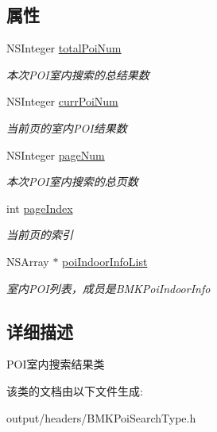 \subsection*{属性}
\begin{DoxyCompactItemize}
\item 
\hypertarget{interface_b_m_k_poi_indoor_result_a4950238a0b927b35c98a33145a5187fd}{}N\+S\+Integer \hyperlink{interface_b_m_k_poi_indoor_result_a4950238a0b927b35c98a33145a5187fd}{total\+Poi\+Num}\label{interface_b_m_k_poi_indoor_result_a4950238a0b927b35c98a33145a5187fd}

\begin{DoxyCompactList}\small\item\em 本次\+P\+O\+I室内搜索的总结果数 \end{DoxyCompactList}\item 
\hypertarget{interface_b_m_k_poi_indoor_result_a4f13b95dc645f49d1593b155518afb13}{}N\+S\+Integer \hyperlink{interface_b_m_k_poi_indoor_result_a4f13b95dc645f49d1593b155518afb13}{curr\+Poi\+Num}\label{interface_b_m_k_poi_indoor_result_a4f13b95dc645f49d1593b155518afb13}

\begin{DoxyCompactList}\small\item\em 当前页的室内\+P\+O\+I结果数 \end{DoxyCompactList}\item 
\hypertarget{interface_b_m_k_poi_indoor_result_a505ca9b103c88a5a8c74d096497ffb78}{}N\+S\+Integer \hyperlink{interface_b_m_k_poi_indoor_result_a505ca9b103c88a5a8c74d096497ffb78}{page\+Num}\label{interface_b_m_k_poi_indoor_result_a505ca9b103c88a5a8c74d096497ffb78}

\begin{DoxyCompactList}\small\item\em 本次\+P\+O\+I室内搜索的总页数 \end{DoxyCompactList}\item 
\hypertarget{interface_b_m_k_poi_indoor_result_ae02f49ff78a9bba396a5529cc6eae031}{}int \hyperlink{interface_b_m_k_poi_indoor_result_ae02f49ff78a9bba396a5529cc6eae031}{page\+Index}\label{interface_b_m_k_poi_indoor_result_ae02f49ff78a9bba396a5529cc6eae031}

\begin{DoxyCompactList}\small\item\em 当前页的索引 \end{DoxyCompactList}\item 
\hypertarget{interface_b_m_k_poi_indoor_result_a5332227a90ccf07371dd3921caff4e61}{}N\+S\+Array $\ast$ \hyperlink{interface_b_m_k_poi_indoor_result_a5332227a90ccf07371dd3921caff4e61}{poi\+Indoor\+Info\+List}\label{interface_b_m_k_poi_indoor_result_a5332227a90ccf07371dd3921caff4e61}

\begin{DoxyCompactList}\small\item\em 室内\+P\+O\+I列表，成员是\+B\+M\+K\+Poi\+Indoor\+Info \end{DoxyCompactList}\end{DoxyCompactItemize}


\subsection{详细描述}
P\+O\+I室内搜索结果类 

该类的文档由以下文件生成\+:\begin{DoxyCompactItemize}
\item 
output/headers/B\+M\+K\+Poi\+Search\+Type.\+h\end{DoxyCompactItemize}
